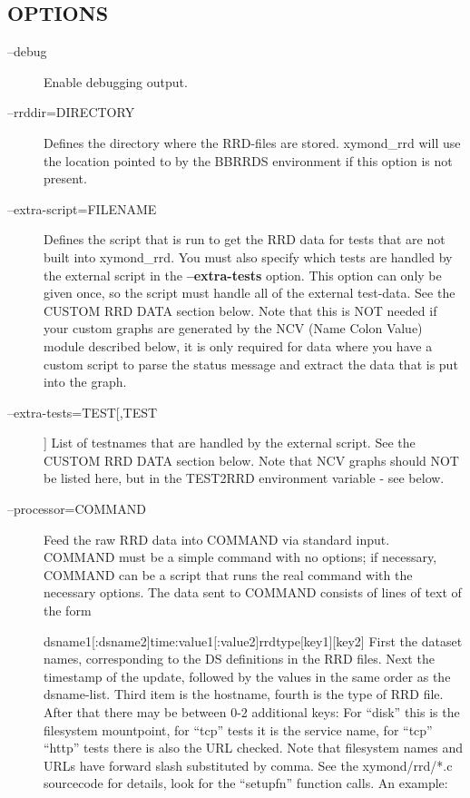 \subsection{OPTIONS}
\begin{description}
\item[--debug] Enable debugging output. 

 

\item[--rrddir=DIRECTORY] Defines the directory where the RRD-files are stored. xymond\_rrd will use the location pointed to by the BBRRDS environment if this option is not present. 

 

\item[--extra-script=FILENAME] Defines the script that is run to get the RRD data for tests that are not built into xymond\_rrd. You must also specify which tests are handled by the external script in the \textbf{--extra-tests}
 option. This option can only be given once, so the script must handle all of the external test-data. See the CUSTOM RRD DATA section below. Note that this is NOT needed if your custom graphs are generated by the NCV (Name Colon Value) module described below, it is only required for data where you have a custom script to parse the status message and extract the data that is put into the graph. 

 

\item[--extra-tests=TEST[,TEST]] List of testnames that are handled by the external script. See the CUSTOM RRD DATA section below. Note that NCV graphs should NOT be listed here, but in the TEST2RRD environment variable - see below. 

 

\item[--processor=COMMAND] Feed the raw RRD data into COMMAND via standard input. COMMAND must be a simple command with no options; if necessary, COMMAND can be a script that runs the real command with the necessary options. The data sent to COMMAND consists of lines of text of the form  
 
dsname1[:dsname2]time:value1[:value2]rrdtype[key1][key2]  
 First the dataset names, corresponding to the DS definitions in the RRD files. Next the timestamp of the update, followed by the values in the same order as the dsname-list. Third item is the hostname, fourth is the type of RRD file. After that there may be between 0-2 additional keys: For ``disk'' this is the filesystem mountpoint, for ``tcp'' tests it is the service name, for ``tcp'' ``http'' tests there is also the URL checked. Note that filesystem names and URLs have forward slash substituted by comma. See the xymond/rrd/*.c sourcecode for details, look for the ``setupfn'' function calls. An example:  



\end{description}
